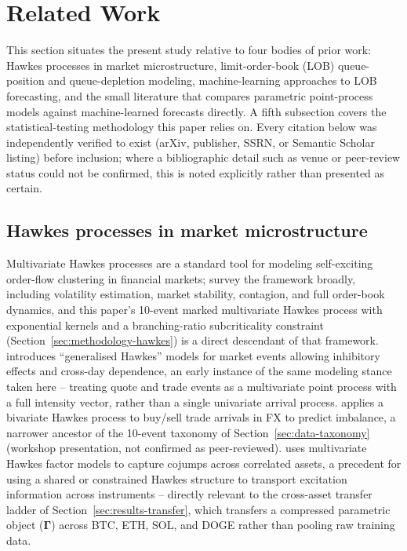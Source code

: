 \section{Related Work}
\label{sec:related-work}

This section situates the present study relative to four bodies of prior
work: Hawkes processes in market microstructure, limit-order-book (LOB)
queue-position and queue-depletion modeling, machine-learning approaches
to LOB forecasting, and the small literature that compares parametric
point-process models against machine-learned forecasts directly. A fifth
subsection covers the statistical-testing methodology this paper relies
on. Every citation below was independently verified to exist (arXiv,
publisher, SSRN, or Semantic Scholar listing) before inclusion; where a
bibliographic detail such as venue or peer-review status could not be
confirmed, this is noted explicitly rather than presented as certain.

\subsection{Hawkes processes in market microstructure}
\label{sec:rw-hawkes}

Multivariate Hawkes processes are a standard tool for modeling
self-exciting order-flow clustering in financial markets;
\citet{bacry2015hawkes} survey the framework broadly, including
volatility estimation, market stability, contagion, and full
order-book dynamics, and this paper's 10-event marked multivariate
Hawkes process with exponential kernels and a branching-ratio
subcriticality constraint (Section~\ref{sec:methodology-hawkes}) is a
direct descendant of that framework. \citet{bowsher2007modelling}
introduces ``generalised Hawkes'' models for market events allowing
inhibitory effects and cross-day dependence, an early instance of the
same modeling stance taken here -- treating quote and trade events as a
multivariate point process with a full intensity vector, rather than a
single univariate arrival process. \citet{hewlett2006clustering} applies
a bivariate Hawkes process to buy/sell trade arrivals in FX to predict
imbalance, a narrower ancestor of the 10-event taxonomy of
Section~\ref{sec:data-taxonomy} (workshop presentation, not confirmed as
peer-reviewed). \citet{bormetti2015modelling} uses multivariate Hawkes
factor models to capture cojumps across correlated assets, a precedent
for using a shared or constrained Hawkes structure to transport
excitation information across instruments -- directly relevant to the
cross-asset transfer ladder of Section~\ref{sec:results-transfer}, which
transfers a compressed parametric object ($\boldsymbol\Gamma$) across
BTC, ETH, SOL, and DOGE rather than pooling raw training data.

